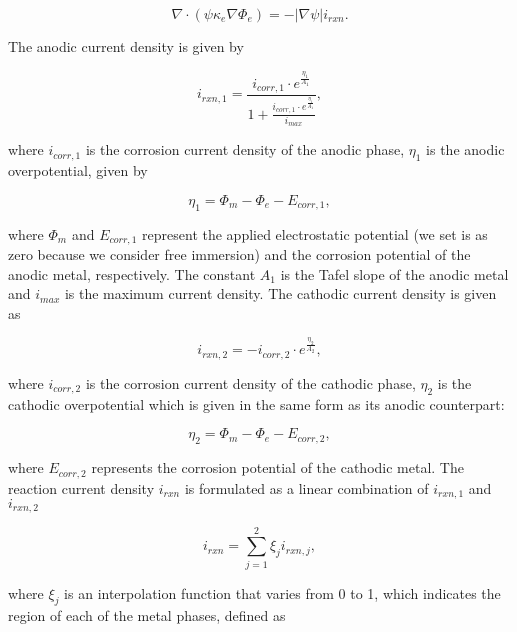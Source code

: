 \documentclass[11pt]{article}
\begin{document}
\begin{equation} \label{Phi_e}
\nabla\cdot\left(\psi\kappa_e\nabla\Phi_e\right) =-|\nabla\psi|i_{rxn}.
\end{equation}

The anodic current density is given by

\begin{equation} \label{i_rxn_1}
i_{rxn,1} = \frac{i_{corr,1}\cdot e^{\frac{\eta_1}{A_1}}}{1+\frac{i_{corr,1}\cdot e^{\frac{\eta_1}{A_{1}}}}{i_{max}}},
\end{equation}

where $i_{corr,1}$ is the corrosion current density of the anodic phase, $\eta_1$ is the anodic overpotential, given by

\begin{equation} \label{eta_1}
\eta_1 = \Phi_m - \Phi_e - E_{corr,1},
\end{equation}

where $\Phi_m$ and $E_{corr,1}$ represent the applied electrostatic potential (we set is as zero because we consider free immersion) and the corrosion potential of the anodic metal, respectively. The constant $A_1$ is the Tafel slope of the anodic metal and $i_{max}$ is the maximum current density. The cathodic current density is given as

\begin{equation} \label{i_rxn_2}
i_{rxn,2}=-i_{corr,2}\cdot e^{\frac{\eta_2}{A_2}},
\end{equation}

where $i_{corr,2}$ is the corrosion current density of the cathodic phase, $\eta_2$ is the cathodic overpotential which is given in the same form as its anodic counterpart:

\begin{equation} \label{eta_2}
\eta_2 = \Phi_m - \Phi_e - E_{corr,2},
\end{equation}

where $E_{corr,2}$ represents the corrosion potential of the cathodic metal. The reaction current density $i_{rxn}$ is formulated as a linear combination of $i_{rxn,1}$ and $i_{rxn,2}$

\begin{equation} \label{i_rxn}
i_{rxn} = \sum^{2}_{j=1}\xi_{j}i_{rxn,j},
\end{equation}

where $\xi_j$ is an interpolation function that varies from 0 to 1, which indicates the region of each of the metal phases, defined as
\end{document}
